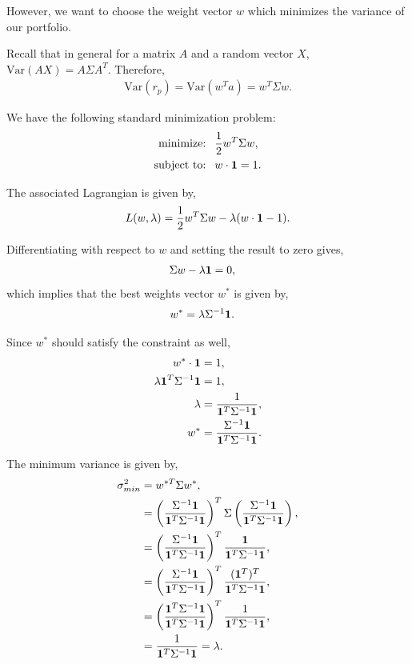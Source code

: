 \documentclass{amsart}
\theoremstyle{plain}
\numberwithin{equation}{section}
\begin{document}
However, we want to choose the weight vector 
$w$ which minimizes the variance of our 
portfolio.

Recall that in general for a matrix $A$ and a random vector $X$, 
$\mathrm{Var}(AX) = A\Sigma A^T$.
Therefore,
\begin{align*}
\mathrm{Var}(r_p) = \mathrm{Var}(w^T a) = w^T\Sigma w.
\end{align*}

We have the following standard minimization problem:
\begin{align*}
\textrm{minimize: }   ~ & \frac{1}{2} w^T\Sigma w,\\
\textrm{subject to: } ~ & w \cdot {\bf 1} = 1.
\end{align*}

The associated Lagrangian is given by,
\begin{align*}
L(w, \lambda) = \frac{1}{2} w^T\Sigma w - \lambda ( w \cdot {\bf 1} - 1 ).
\end{align*}

Differentiating with respect to $w$ and setting the result to zero gives,
\begin{align*}
\Sigma w - \lambda {\bf 1} & = 0,
\end{align*}
which implies that the best weights vector
$w^*$ is given by,
\begin{align*}
w^* &= \lambda \Sigma^{-1} {\bf 1}.
\end{align*}

Since $w^*$ should satisfy the constraint as well,
\begin{align*}
w^* \cdot {\bf 1} &= 1,\\
\lambda {\bf 1}^T \Sigma^{-1} {\bf 1} &= 1,\\
\lambda &=\frac{1}{{\bf 1}^T \Sigma^{-1} {\bf 1}},\\
w^* &=\frac{\Sigma^{-1} {\bf 1}}{{\bf 1}^T \Sigma^{-1} {\bf 1}}.
\end{align*}

The minimum variance is given by,
\begin{align*}
\sigma_{min}^2 &= w^{*T} \Sigma w^{*},\\
&= \left(\frac{\Sigma^{-1} {\bf 1}}{{\bf 1}^T \Sigma^{-1} {\bf 1}}\right)^T
\Sigma \left(\frac{\Sigma^{-1} {\bf 1}}{{\bf 1}^T \Sigma^{-1} {\bf 1}}\right),\\
&=  \left(\frac{\Sigma^{-1} {\bf 1}}{{\bf 1}^T \Sigma^{-1} {\bf 1}}\right)^T
\frac{{\bf 1}}{{\bf 1}^T \Sigma^{-1} {\bf 1}},\\
&= \left(\frac{\Sigma^{-1} {\bf 1}}{{\bf 1}^T \Sigma^{-1} {\bf 1}}\right)^T
\frac{({\bf 1}^T)^T}{{\bf 1}^T \Sigma^{-1} {\bf 1}},\\
&= \left(\frac{{\bf 1}^T \Sigma^{-1} {\bf 1}}{{\bf 1}^T \Sigma^{-1} {\bf 1}}\right)^T
\frac{1}{{\bf 1}^T \Sigma^{-1} {\bf 1}},\\
&= \frac{1}{{\bf 1}^T \Sigma^{-1} {\bf 1}} = \lambda.
\end{align*}
\end{document}
